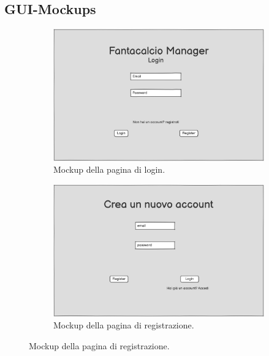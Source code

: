 \begin{table}[H]
\end{table}




\subsection{GUI-Mockups}
\begin{figure}[H]
    \centering

    \begin{subfigure}[b]{0.49\textwidth}
        \centering
        \includegraphics[width=\textwidth]{Resources/Mockups/Login.png}
        \caption{Mockup della pagina di login.}
        \label{fig:pagina_login}
    \end{subfigure}
    \hfill
    \begin{subfigure}[b]{0.49\textwidth}
        \centering
        \includegraphics[width=\textwidth]{Resources/Mockups/Registrazione.png}
        \caption{Mockup della pagina di registrazione.}
        \label{fig:pagina_registrazione}
    \end{subfigure}


\end{figure}
